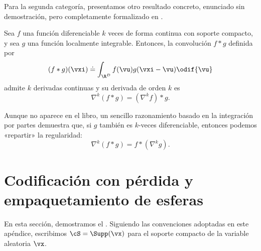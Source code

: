 \documentclass[../../book-main_es.tex]{subfiles}
\begin{document}
Para la segunda categoría, presentamos otro resultado concreto, enunciado
sin demostración, pero completamente formalizado en \cite{brezis2011functional}.
\begin{proposition}\label{prop:diff_convolution}
    Sea \(f\) una función diferenciable \(k\) veces de forma continua con soporte compacto,
    y sea \(g\) una función localmente integrable. Entonces, la
    convolución \(f * g\) definida por
    \begin{equation}
        (f * g)(\vxi) \doteq \int_{\R^{D}}f(\vu)g(\vxi - \vu)\odif{\vu}
    \end{equation}
    admite \(k\) derivadas continuas y su derivada de
    orden \(k\) es
    \begin{equation}
        \nabla^{k}(f * g) =(\nabla^{k}f) * g.
    \end{equation}
\end{proposition}
Aunque no aparece en el libro, un sencillo razonamiento basado en la integración por partes
demuestra que, si \(g\) también es \(k\)-veces diferenciable, entonces podemos
«repartir» la regularidad:
\begin{equation}
    \nabla^{k}(f * g) = f * (\nabla^{k} g).
\end{equation}

\section{Codificación con pérdida y empaquetamiento de esferas}\label{app:rate-distortion-covering}

En esta sección, demostramos el .
Siguiendo las convenciones adoptadas en este apéndice, escribimos $\cS = \Supp(\vx)$
para el soporte compacto de la variable aleatoria $\vx$.
\end{document}
